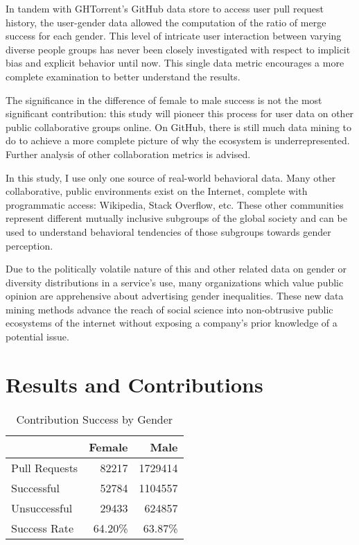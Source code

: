 \documentclass{sigplanconf}
\begin{document}
In tandem with GHTorrent's GitHub data store to
access user pull request history, the user-gender data allowed the computation of
the ratio of merge success for each gender. This level of intricate user interaction
between varying diverse people groups has never been closely investigated with
respect to implicit bias and explicit behavior until
now. This single data metric encourages a more complete examination to better
understand the results.

The significance in the difference of female to male success is not the most
significant contribution: this study will pioneer this process for user data on
other public collaborative groups online.
On GitHub, there is still much data mining to do to achieve a more complete
picture of why the ecosystem is underrepresented. Further analysis of other
collaboration metrics is advised.

In this study, I use only one source of real-world behavioral data.
Many other collaborative, public environments exist on the Internet, complete
with programmatic access: Wikipedia, Stack Overflow, etc. These other
communities represent different mutually inclusive subgroups of the global
society and can be used to understand behavioral tendencies of those subgroups
towards gender perception.

Due to the politically volatile nature of this and other related data on gender
or diversity distributions in a service's use, many organizations which value
public opinion are apprehensive about advertising gender inequalities. These new data
mining methods advance the reach of social science into non-obtrusive public
ecosystems of the internet without exposing a company's prior knowledge of a
potential issue.

\section{Results and Contributions}

\begin{table}[h]
  \begin{center}
    \caption{Contribution Success by Gender}
    \begin{tabular}{l|r|r}
      & Female & Male\\ \hline
      Pull Requests & \num{82217} & \num{1729414} \\ \hline
      Successful  & \num{52784} & \num{1104557} \\ \hline
      Unsuccessful  & \num{29433} & \num{624857} \\ \hline
      Success Rate & \num{64.20}\% & \num{63.87}\% \\ \hline
    \end{tabular}
  \end{center}
\end{table}
\end{document}
